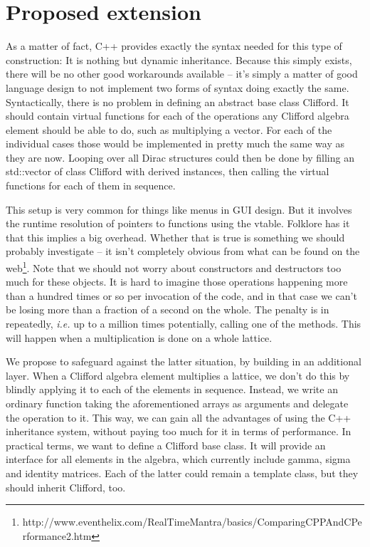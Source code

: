 \documentclass[a4paper,10pt]{article}
\begin{document}
\section{Proposed extension}

As a matter of fact, C++ provides exactly the syntax needed for this type of construction: It is
nothing but dynamic inheritance. Because this simply exists, there will be no other good workarounds
available -- it's simply a matter of good language design to not implement two forms of syntax
doing exactly the same. Syntactically, there is no problem in defining an abstract base class
Clifford. It should contain virtual functions for each of the operations any Clifford algebra
element should be able to do, such as multiplying a vector. For each of the individual cases those 
would be implemented in pretty much the same way as they are now. Looping over all Dirac structures
could then be done by filling an std::vector of class Clifford with derived instances, then calling
the virtual functions for each of them in sequence.

This setup is very common for things like menus in GUI design. But it involves the runtime resolution
of pointers to functions using the vtable. Folklore has it that this implies a big overhead. Whether
that is true is something we should probably investigate -- it isn't completely obvious from what
can be found on the web\footnote{http://www.eventhelix.com/RealTimeMantra/basics/ComparingCPPAndCPerformance2.htm}.
Note that we should not worry about constructors and destructors too much for these objects. It is
hard to imagine those operations happening more than a hundred times or so per invocation of the code,
and in that case we can't be losing more than a fraction of a second on the whole. The penalty is in 
repeatedly, \emph{i.e.} up to a million times potentially, calling one of the methods. This will happen
when a multiplication is done on a whole lattice.

We propose to safeguard against the latter situation, by building in an additional layer. When a
Clifford algebra element multiplies a lattice, we don't do this by blindly applying it to each of
the elements in sequence. Instead, we write an ordinary function taking the aforementioned arrays
as arguments and delegate the operation to it. This way, we can gain all the advantages of using
the C++ inheritance system, without paying too much for it in terms of performance. In practical 
terms, we want to define a Clifford base class. It will provide an interface for all elements in the 
algebra, which currently include gamma, sigma and identity matrices. Each of the latter could remain 
a template class, but they should inherit Clifford, too. 
\end{document}
